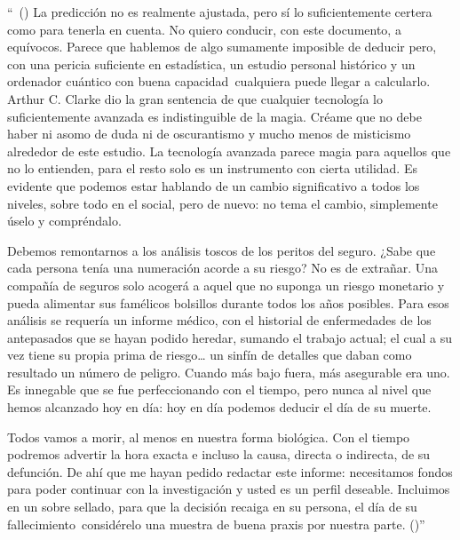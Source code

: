 \begin{em}
``\ (\textellipsis) La predicción no es realmente ajustada, pero sí lo suficientemente certera como para tenerla en cuenta. No quiero conducir, con este documento, a equívocos. Parece que hablemos de algo sumamente imposible de deducir pero, con una pericia suficiente en estadística, un estudio personal histórico y un ordenador cuántico con buena capacidad\textellipsis\ cualquiera puede llegar a calcularlo. Arthur C. Clarke dio la gran sentencia de que cualquier tecnología lo suficientemente avanzada es indistinguible de la magia. Créame que no debe haber ni asomo de duda ni de oscurantismo y mucho menos de misticismo alrededor de este estudio. La tecnología avanzada parece magia para aquellos que no lo entienden, para el resto solo es un instrumento con cierta utilidad. Es evidente que podemos estar hablando de un cambio significativo a todos los niveles, sobre todo en el social, pero de nuevo: no tema el cambio, simplemente úselo y compréndalo. 

Debemos remontarnos a los análisis toscos de los peritos del seguro. ¿Sabe que cada persona tenía una numeración acorde a su riesgo? No es de extrañar. Una compañía de seguros solo acogerá a aquel que no suponga un riesgo monetario y pueda alimentar sus famélicos bolsillos durante todos los años posibles. Para esos análisis se requería un informe médico, con el historial de enfermedades de los antepasados que se hayan podido heredar, sumando el trabajo actual; el cual a su vez tiene su propia prima de riesgo… un sinfín de detalles que daban como resultado un número de peligro. Cuando más bajo fuera, más asegurable era uno. Es innegable que se fue perfeccionando con el tiempo, pero nunca al nivel que hemos alcanzado hoy en día: hoy en día podemos deducir el día de su muerte. 

Todos vamos a morir, al menos en nuestra forma biológica. Con el tiempo podremos advertir la hora exacta e incluso la causa, directa o indirecta, de su defunción. De ahí que me hayan pedido redactar este informe: necesitamos fondos para poder continuar con la investigación y usted es un perfil deseable. Incluimos en un sobre sellado, para que la decisión recaiga en su persona, el día de su fallecimiento\textellipsis\ considérelo una muestra de buena praxis por nuestra parte. (\textellipsis)''
\end{em}